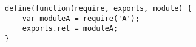 
\lstset{language=C}

\begin{lstlisting}[frame=single]
define(function(require, exports, module) {
	var moduleA = require('A');		
	exports.ret = moduleA;
}
\end{lstlisting}